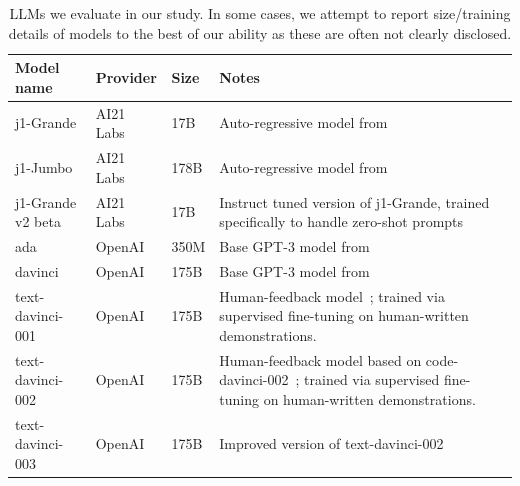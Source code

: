 \begin{table}

    \caption{LLMs we evaluate in our study. In some cases, we attempt to report size/training details of models to the best of our ability as these are often not clearly disclosed.}
    \label{tab:models}
    \vskip 0.15in
    \renewcommand{\arraystretch}{1.5}
    \begin{center}
    \begin{small}

        \begin{tabular}{lllp{8cm}}
            \toprule
    Model name &  Provider & Size & Notes \\
            \midrule
            j1-Grande & AI21 Labs & 17B & Auto-regressive model from \citet{lieber2021jurassic} \\
            j1-Jumbo  & AI21 Labs & 178B & Auto-regressive model from \citet{lieber2021jurassic} \\
            j1-Grande v2 beta & AI21 Labs & 17B &  Instruct tuned version of j1-Grande, trained specifically to handle zero-shot prompts  \\
            ada & OpenAI & 350M & Base GPT-3 model from \citet{Brown20} \\
            davinci & OpenAI & 175B & Base GPT-3 model from \citet{Brown20} \\
            text-davinci-001 & OpenAI & 175B & Human-feedback model~\citep{ouyang2022training}; trained via supervised fine-tuning on human-written demonstrations. \\
            text-davinci-002 & OpenAI & 175B & Human-feedback model based on code-davinci-002~\citep{ouyang2022training}; trained via supervised fine-tuning on human-written demonstrations. \\
            text-davinci-003 & OpenAI & 175B & Improved version of text-davinci-002~\citep{ouyang2022training} \\
            \bottomrule
            \end{tabular}
    \end{small}
 \end{center}    
 \vskip -0.1in
 \end{table}
 